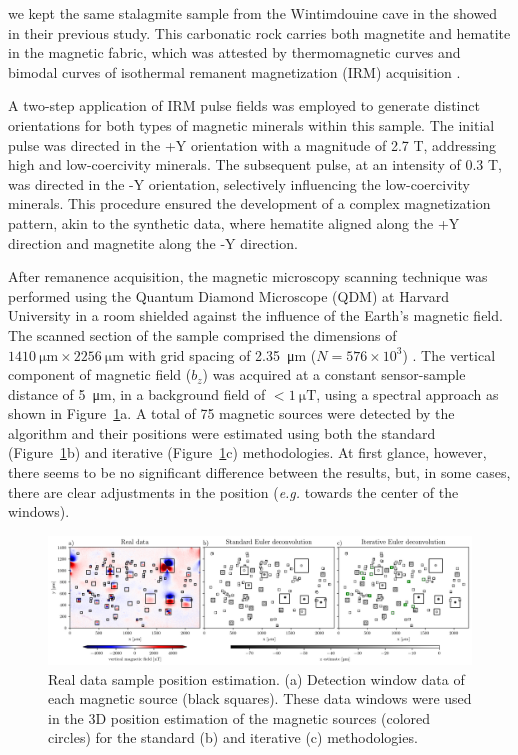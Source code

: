 we kept the same stalagmite sample from the Wintimdouine cave in the  \citep[Agadir (Morocco),][]{Ait2019Hydro} showed in their previous study. This carbonatic rock carries both magnetite and hematite in the magnetic fabric, which was attested by thermomagnetic curves and bimodal curves of isothermal remanent magnetization (IRM) acquisition \citep{carmo2019speleothem}.

A two-step application of IRM pulse fields was employed to generate distinct orientations for both types of magnetic minerals within this sample. The initial pulse was directed in the +Y orientation with a magnitude of 2.7 T, addressing high and low-coercivity minerals. The subsequent pulse, at an intensity of 0.3 T, was directed in the -Y orientation, selectively influencing the low-coercivity minerals. This procedure ensured the development of a complex magnetization pattern, akin to the synthetic data, where hematite aligned along the +Y direction and magnetite along the -Y direction.

After remanence acquisition, the magnetic microscopy scanning technique was performed using the Quantum Diamond Microscope (QDM) at Harvard University in a room shielded against the influence of the Earth's magnetic field. The scanned section of the sample comprised the dimensions of $\qty{1410}{\um} \times \qty{2256}{\um}$ with grid spacing of \qty{2.35}{\um} ($N = 576 \times 10^{3}$) \citep{janinedata}. The vertical component of magnetic field ($b_z$) was acquired at a constant sensor-sample distance of \qty{5}{\um}, in a background field of $< \qty{1}{\micro\tesla}$, using a spectral approach \citep{Lima2009, Fu2020, Glenn2017} as shown in Figure~\ref{real-data-euler}a. A total of 75 magnetic sources were detected by the algorithm and their positions were estimated using both the standard (Figure~\ref{real-data-euler}b) and iterative (Figure~\ref{real-data-euler}c) methodologies. At first glance, however, there seems to be no significant difference between the results, but, in some cases, there are clear adjustments in the position (\textit{e.g.} towards the center of the windows).

\begin{figure}[tb!]
  \centering
  \includegraphics[width=1\linewidth]{paper/figures/euler-comparion-real.png}
  \caption{Real data sample position estimation. (a) Detection window data of each magnetic source (black squares). These data windows were used in the 3D position estimation of the magnetic sources (colored circles) for the standard (b) and iterative (c) methodologies. }
  \label{real-data-euler}
\end{figure}

